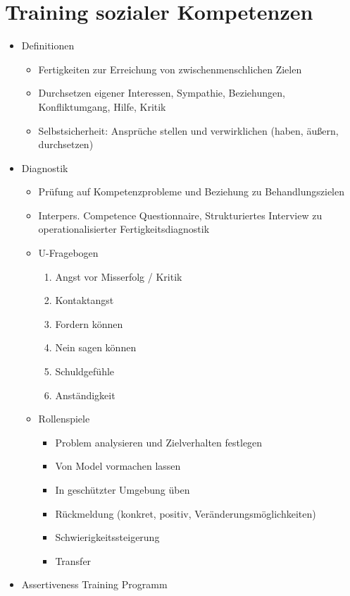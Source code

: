 \documentclass[11pt, paper=a4, twocolumn]{scrartcl}
\begin{document}
	\section{Training sozialer Kompetenzen}
		\begin{itemize}
			\item Definitionen
				\begin{itemize}
					\item Fertigkeiten zur Erreichung von zwischenmenschlichen Zielen
					\item Durchsetzen eigener Interessen, Sympathie, Beziehungen, Konfliktumgang, Hilfe, Kritik
					\item Selbstsicherheit: Ansprüche stellen und verwirklichen (haben, äußern, durchsetzen)
				\end{itemize}
			\item Diagnostik
				\begin{itemize}
					\item Prüfung auf Kompetenzprobleme und Beziehung zu Behandlungszielen
					\item Interpers. Competence Questionnaire, Strukturiertes Interview zu operationalisierter Fertigkeitsdiagnostik
					\item U-Fragebogen
						\begin{enumerate}
							\item Angst vor Misserfolg / Kritik
							\item Kontaktangst
							\item Fordern können
							\item Nein sagen können
							\item Schuldgefühle
							\item Anständigkeit
						\end{enumerate}
					\item Rollenspiele
						\begin{itemize}
							\item Problem analysieren und Zielverhalten festlegen
							\item Von Model vormachen lassen
							\item In geschützter Umgebung üben
							\item Rückmeldung (konkret, positiv, Veränderungsmöglichkeiten)
							\item Schwierigkeitssteigerung
							\item Transfer
						\end{itemize}
				\end{itemize}
			\item Assertiveness Training Programm

\end{itemize}
\end{document}
